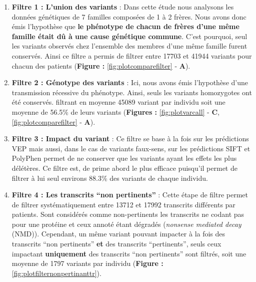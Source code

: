 \documentclass[12pt,twoside]{ugathesis}
\begin{document}
\begin{enumerate}
\def\labelenumi{\arabic{enumi}.}
\item
  \textbf{Filtre 1 : L'union des variants} : Dans cette étude nous
  analysons les données génétiques de 7 familles composées de 1 à 2
  frères. Nous avons donc émis l'hypothèse que \textbf{le phénotype de
  chacun de frères d'une même famille était dû à une cause génétique
  commune}. C'est pourquoi, seul les variants observés chez l'ensemble
  des membres d'une même famille furent conservés. Ainsi ce filtre a
  permis de filtrer entre 17703 et 41944 variants pour chacun des
  patients (\textbf{Figure : }\ref{fig:plotcomparefilter} - \textbf{A}).
\item
  \textbf{Filtre 2 : Génotype des variants} : Ici, nous avons émis
  l'hypothèse d'une transmission récessive du phénotype. Ainsi, seuls
  les variants homozygotes ont été conservés. filtrant en moyenne 45089
  variant par individu soit une moyenne de 56.5\% de leurs variants
  (\textbf{Figures : }\ref{fig:plotvarcall} - \textbf{C},
  \ref{fig:plotcomparefilter} - \textbf{A}).
\item
  \textbf{Filtre 3 : Impact du variant} : Ce filtre se base à la fois
  sur les prédictions VEP mais aussi, dans le cas de variants faux-sens,
  sur les prédictions SIFT et PolyPhen permet de ne conserver que les
  variants ayant les effets les plus délétères. Ce filtre est, de prime
  abord le plus efficace puisqu'il permet de filtrer à lui seul environs
  88.3\% des variants de chaque individu.
\item
  \textbf{Filtre 4 : Les transcrits ``non pertinents''} : Cette étape de
  filtre permet de filtrer systématiquement entre 13712 et 17992
  transcrits différents par patients. Sont considérés comme
  non-pertinents les transcrits ne codant pas pour une protéine et ceux
  annoté étant dégradés (\emph{nonsense mediated decay} (NMD)).
  Cependant, un même variant pouvant impacter à la fois des transcrits
  ``non pertinents'' \textbf{et} des transcrits ``pertinents'', seuls
  ceux impactant \textbf{uniquement} des transcrits ``non pertinents''
  sont filtrés, soit une moyenne de 1797 variants par individu
  (\textbf{Figure : }\ref{fig:plotfilternonpertinanttr}).
\end{enumerate}

\newpage 
\end{document}
